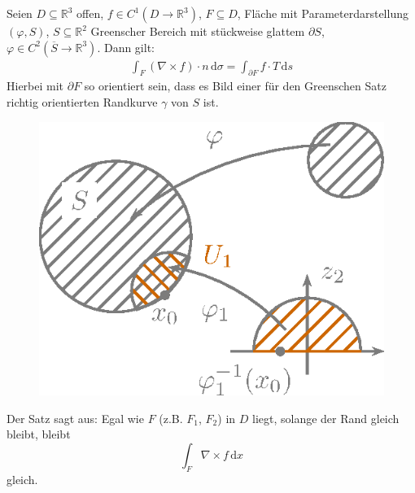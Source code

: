 \documentclass[a4paper,10pt]{scrbook}
\begin{document}
\begin{theorem} \label{thm:8.11}
  Seien $D \subseteq \mathbb{R}^3$ offen, $f \in C^1(D \to \mathbb{R}^3)$, $F \subseteq D$, Fläche mit Parameterdarstellung $(\varphi,S)$, $S \subseteq \mathbb{R}^2$ Greenscher Bereich mit stückweise glattem $\partial S$, $\varphi \in C^2(\overline{S} \to \mathbb{R}^3)$. Dann gilt:
  \begin{align*}
    \int_F (\nabla \times f) \cdot n \, \mathrm{d}\sigma = \int_{\partial F} f \cdot T \, \mathrm{d}s
  \end{align*}
  Hierbei mit $\partial F$ so orientiert sein, dass es Bild einer für den Greenschen Satz richtig orientierten Randkurve $\gamma$ von $S$ ist.
    \begin{figure}[H]
      \centering
      \includegraphics[scale=0.2]{images/ana3-tmp-71}
    \end{figure}
  Der Satz sagt aus: Egal wie $F$ (z.B. $F_1$, $F_2$) in $D$ liegt, solange der Rand gleich bleibt, bleibt \[ \int_F \nabla \times f \, \mathrm{d}x \] gleich.


\end{theorem}
\end{document}
